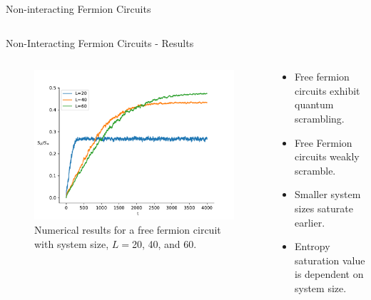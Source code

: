 \begin{frame}{Non-interacting Fermion Circuits}
\begin{columns}
\end{columns}
\end{frame}

    \begin{frame}{Non-Interacting Fermion Circuits - Results}
\begin{columns}
    \begin{column}{0.475\textwidth}
        \begin{figure}
            \includegraphics[width = \textwidth]{QS_Images/EntanglementEntropy_varL.pdf}
            \caption{Numerical results for a free fermion circuit with system size, $L=$20, 40, and 60.}
        \end{figure}
    \end{column}

    \begin{column}{0.5\textwidth}
        \begin{itemize}
            \item Free fermion circuits exhibit quantum scrambling.
            \item Free Fermion circuits weakly scramble.
            \item Smaller system sizes saturate earlier. 
            \item Entropy saturation value is dependent on system size.
        \end{itemize}
    \end{column}




\end{columns}
        
    \end{frame}


